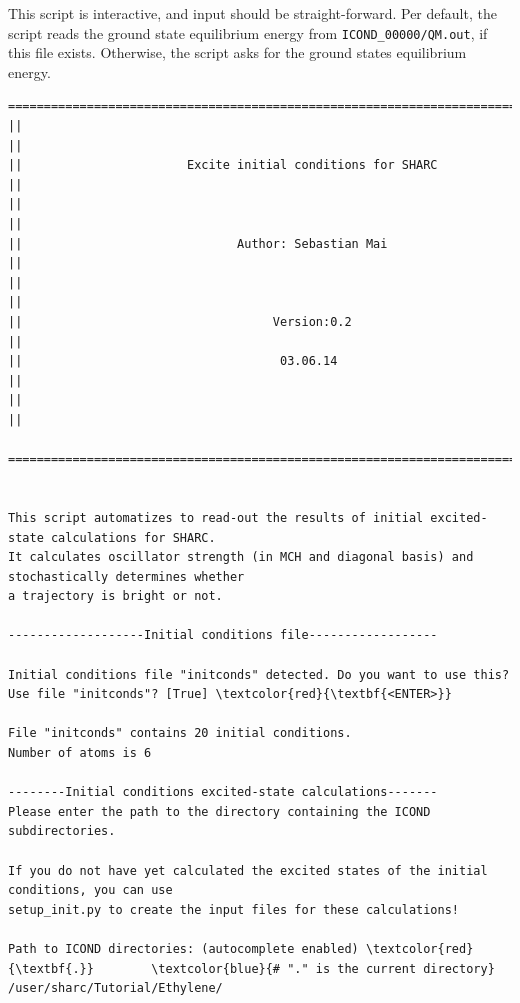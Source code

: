 \documentclass[a4paper,11pt,DIV=15,openany]{scrbook}
\newcommand{\ttt}[1]{\texttt{#1}}
\begin{document}
This script is interactive, and input should be straight-forward. Per default, the script reads the ground state equilibrium energy from \ttt{ICOND\_00000/QM.out}, if this file exists. Otherwise, the script asks for the ground states equilibrium energy.

\begin{oframed}
\footnotesize\begin{Verbatim}[commandchars=\\\{\}]
  ================================================================================
||                                                                                ||
||                       Excite initial conditions for SHARC                      ||
||                                                                                ||
||                              Author: Sebastian Mai                             ||
||                                                                                ||
||                                   Version:0.2                                  ||
||                                    03.06.14                                    ||
||                                                                                ||
  ================================================================================


This script automatizes to read-out the results of initial excited-state calculations for SHARC.
It calculates oscillator strength (in MCH and diagonal basis) and stochastically determines whether
a trajectory is bright or not.
  
-------------------Initial conditions file------------------

Initial conditions file "initconds" detected. Do you want to use this?
Use file "initconds"? [True] \textcolor{red}{\textbf{<ENTER>}}

File "initconds" contains 20 initial conditions.
Number of atoms is 6

--------Initial conditions excited-state calculations-------
Please enter the path to the directory containing the ICOND subdirectories.

If you do not have yet calculated the excited states of the initial conditions, you can use 
setup_init.py to create the input files for these calculations!

Path to ICOND directories: (autocomplete enabled) \textcolor{red}{\textbf{.}}        \textcolor{blue}{# "." is the current directory}
/user/sharc/Tutorial/Ethylene/


\end{Verbatim}
\end{oframed}
\end{document}
